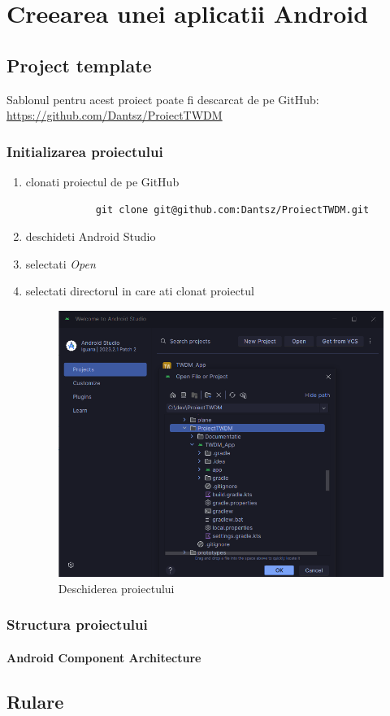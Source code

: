 \section{Creearea unei aplicatii Android}
\subsection{Project template}
Sablonul pentru acest proiect poate fi descarcat de pe GitHub: \url{https://github.com/Dantsz/ProiectTWDM}
\subsubsection{Initializarea proiectului}
\begin{enumerate}
    \item clonati proiectul de pe GitHub
          \begin{lstlisting}
            git clone git@github.com:Dantsz/ProiectTWDM.git
        \end{lstlisting}
    \item deschideti Android Studio
    \item selectati \textit{Open}
    \item selectati directorul in care ati clonat proiectul
          \begin{figure}[H]
              \centering
              \includegraphics[width=0.7\linewidth]{figs/open_project.png}
              \caption{Deschiderea proiectului}
              \label{fig:open_project}
          \end{figure}
\end{enumerate}
\subsubsection{Structura proiectului}
\paragraph{Android Component Architecture}
\subsection{Rulare}